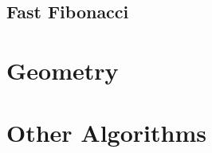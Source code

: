 \documentclass[13pt]{article}
\begin{document}
\subsection{Fast Fibonacci}\label{sub:fast_fibonacci} %


\section{Geometry}


\section{Other Algorithms}


\end{document}
